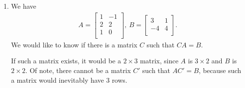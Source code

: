 \documentclass[12pt]{article}
\begin{document}
\begin{enumerate}
  \item
    We have
    \begin{align*}
      A =
      \begin{bmatrix}
        1 & -1\\
        2 &  2\\
        1 &  0\\
      \end{bmatrix},\
      B =
      \begin{bmatrix}
        3  & 1\\
        -4 & 4\\
      \end{bmatrix}.
    \end{align*}
    We would like to know if there is a matrix $C$ such that $CA
    = B$.

    If such a matrix exists, it would be a $2 \times 3$ matrix,
    since $A$ is $3 \times 2$ and $B$ is $2 \times 2$. Of note,
    there cannot be a matrix $C'$ such that $AC' = B$, because
    such a matrix would inevitably have $3$ rows.


\end{enumerate}
\end{document}
